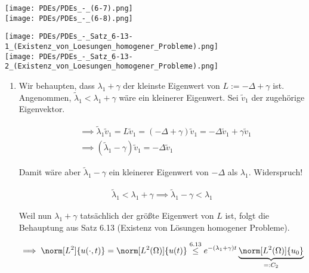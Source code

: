 \begin{solution}

\phantom{}

\begin{tcolorbox}[standard jigsaw, opacityback = 0]
  \center
  \texttt{[image: PDEs/PDEs\_-\_(6-7).png]} \\
  \vspace{0.1 cm}
  \hspace{3 cm}
  \texttt{[image: PDEs/PDEs\_-\_(6-8).png]}
\end{tcolorbox}

\begin{center}
  \texttt{[image: PDEs/PDEs\_-\_Satz\_6-13-1\_(Existenz\_von\_Loesungen\_homogener\_Probleme).png]} \\
  \texttt{[image: PDEs/PDEs\_-\_Satz\_6-13-2\_(Existenz\_von\_Loesungen\_homogener\_Probleme).png]}
\end{center}

\begin{enumerate}[label = (\roman*)]

  \item Wir behaupten, dass $\lambda_1 + \gamma$ der kleinste Eigenwert von $L := -\Delta + \gamma$ ist.
  Angenommen, $\tilde \lambda_1 < \lambda_1 + \gamma$ wäre ein kleinerer Eigenwert.
  Sei $\tilde v_1$ der zugehörige Eigenvektor.

  \begin{align*}
    & \implies
    \tilde \lambda_1 \tilde v_1
    =
    L \tilde v_1
    =
    (-\Delta + \gamma) \tilde v_1
    =
    -\Delta \tilde v_1 + \gamma \tilde v_1 \\
    & \implies
    (\tilde \lambda_1 - \gamma) \tilde v_1
    =
    -\Delta \tilde v_1
  \end{align*}

  Damit wäre aber $\tilde \lambda_1 - \gamma$ ein kleinerer Eigenwert von $-\Delta$ als $\lambda_1$.
  Widerspruch!

  \begin{align*}
    \tilde \lambda_1
    <
    \lambda_1 + \gamma
    \implies
    \tilde \lambda_1 - \gamma
    <
    \lambda_1
  \end{align*}

  Weil nun $\lambda_1 + \gamma$ tatsächlich der größte Eigenwert von $L$ ist, folgt die Behauptung aus Satz 6.13 (Existenz von Lösungen homogener Probleme).

  \begin{align*}
    \implies
    \norm[L^2]{u(\cdot, t)}
    =
    \norm[L^2(\Omega)]{u(t)}
    \stackrel
    {
      \mathrm{6.13}
    }{\leq}
    e^{-(\lambda_1 + \gamma) t}
    \underbrace
    {
      \norm[L^2(\Omega)]{u_0}
    }_{
      =: C_2
    }
  \end{align*}


\end{enumerate}
\end{solution}

